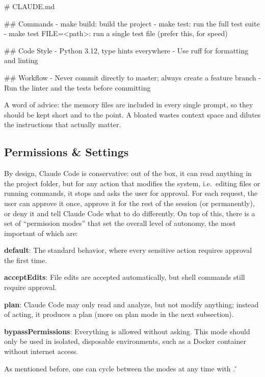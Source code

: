 \begin{block}
# CLAUDE.md

## Commands
- make build: build the project
- make test: run the full test suite
- make test FILE=<path>: run a single test file (prefer this, for speed)

## Code Style
- Python 3.12, type hints everywhere
- Use ruff for formatting and linting

## Workflow
- Never commit directly to master; always create a feature branch
- Run the linter and the tests before committing
\end{block}

A word of advice: the memory files are included in every single prompt, so they should be kept short and to the
point. A bloated  wastes context space and dilutes the instructions that actually matter.

\subsection{Permissions \& Settings}

By design, Claude Code is conservative: out of the box, it can read anything in the project folder, but for any
action that modifies the system, i.e.\ editing files or running commands, it stops and asks the user for approval.
For each request, the user can approve it once, approve it for the rest of the session (or permanently), or deny it
and tell Claude Code what to do differently. On top of this, there is a set of ``permission modes'' that set the
overall level of autonomy, the most important of which are:
\bit
\item \textbf{default}: The standard behavior, where every sensitive action requires approval the first time.
\item \textbf{acceptEdits}: File edits are accepted automatically, but shell commands still require approval.
\item \textbf{plan}: Claude Code may only read and analyze, but not modify anything; instead of acting, it produces a
plan (more on plan mode in the next subsection).
\item \textbf{bypassPermissions}: Everything is allowed without asking. This mode should only be used in isolated,
disposable environments, such as a Docker container without internet access.
\eit

As mentioned before, one can cycle between the modes at any time with . \v

